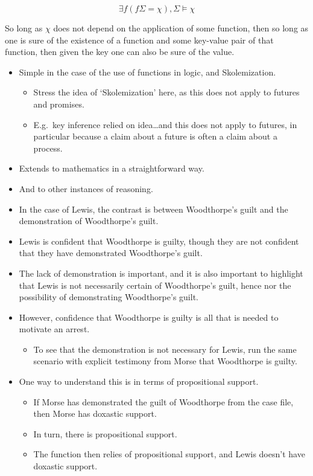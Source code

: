 \documentclass[10pt]{article}
\begin{document}
\[
\exists f(f\Sigma = \chi), \Sigma \vDash \chi
\]

So long as \(\chi\) does not depend on the application of some function, then so long as one is sure of the existence of a function and some key-value pair of that function, then given the key one can also be sure of the value.

\begin{itemize}
\item Simple in the case of the use of functions in logic, and Skolemization.
  \begin{itemize}
  \item {\color{red} Stress the idea of `Skolemization' here, as this does not apply to futures and promises.}
  \item E.g.\ key inference relied on idea\dots and this does not apply to futures, in particular because a claim about a future is often a claim about a process.
  \end{itemize}
\item Extends to mathematics in a straightforward way.
\item And to other instances of reasoning.
\end{itemize}

\begin{itemize}
\item In the case of Lewis, the contrast is between Woodthorpe's guilt and the demonstration of Woodthorpe's guilt.
\item Lewis is confident that Woodthorpe is guilty, though they are not confident that they have demonstrated Woodthorpe's guilt.
\item The lack of demonstration is important, and it is also important to highlight that Lewis is not necessarily certain of Woodthorpe's guilt, hence nor the possibility of demonstrating Woodthorpe's guilt.
\item However, confidence that Woodthorpe is guilty is all that is needed to motivate an arrest.
  \begin{itemize}
  \item To see that the demonstration is not necessary for Lewis, run the same scenario with explicit testimony from Morse that Woodthorpe is guilty.
  \end{itemize}
\item One way to understand this is in terms of propositional support.
  \begin{itemize}
  \item If Morse has demonstrated the guilt of Woodthorpe from the case file, then Morse has doxastic support.
  \item In turn, there is propositional support.
  \item The function then relies of propositional support, and Lewis doesn't have doxastic support.
  \end{itemize}
\end{itemize}
\end{document}
